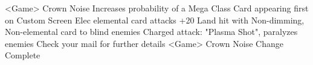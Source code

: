 <Game> Crown Noise 
Increases probability of a Mega Class Card appearing first on Custom Screen 
Elec elemental card attacks +20 
Land hit with Non-dimming, Non-elemental card to blind enemies 
Charged attack: "Plasma Shot", paralyzes enemies 
Check your mail for further details 
<Game> Crown Noise Change Complete 
